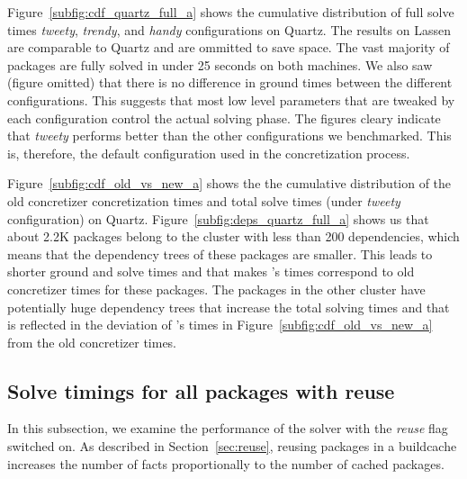 Figure~\ref{subfig:cdf_quartz_full_a} shows the cumulative distribution of full solve times  \emph{tweety}, \emph{trendy}, and \emph{handy} configurations on Quartz.
The results on Lassen are comparable to Quartz and are ommitted to save space. The vast majority of packages are fully solved in under 25 seconds on both machines. We also saw (figure omitted) that there is no difference in ground times between the different configurations. This suggests that most low level parameters that are tweaked by each configuration control the actual solving phase. The figures cleary indicate that \emph{tweety} performs better than the other configurations we benchmarked. This is, therefore, the default configuration used in the concretization process.

Figure~\ref{subfig:cdf_old_vs_new_a} shows the the cumulative distribution of the old concretizer concretization times and \clingo{} total solve times (under \emph{tweety} configuration) on Quartz. Figure~\ref{subfig:deps_quartz_full_a} shows us that about 2.2K packages belong to the cluster with less than 200 dependencies, which means that the dependency trees of these packages are smaller. This leads to shorter ground and solve times and that makes \clingo{}'s times correspond to old concretizer times for these packages. The packages in the other cluster have potentially huge dependency trees that increase the total solving times and that is reflected in the deviation of \clingo{}'s times in Figure~\ref{subfig:cdf_old_vs_new_a} from the old concretizer times.


\subsection{Solve timings for all packages with reuse}

In this subsection, we examine the performance of the solver with the \emph{reuse} flag switched on. As described in Section~\ref{sec:reuse}, reusing packages in a buildcache increases the number of facts proportionally to the number of cached packages.

% 

